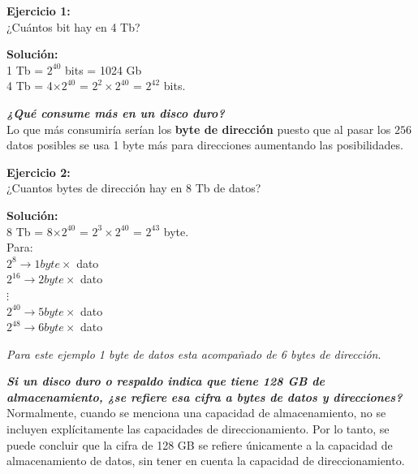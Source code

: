 \documentclass{templateNote}
\begin{document}
\begin{tcolorbox}[colback=green!5!white,colframe=green!75!black,title=Ejercicio]
    \textbf{Ejercicio 1:} \\
    ¿Cuántos bit hay en 4 Tb? \\
    \begin{center}
        \textbf{Solución:} \\
        1 Tb = $2^{40}$ bits = 1024 Gb\\
        4 Tb = 4$\times2^{40}$ = $2^{2}\times2^{40}$ = $2^{42}$ bits.

    \end{center}
\end{tcolorbox}

\noindent \textit{\textbf{¿Qué consume más en un disco duro?}}\\
Lo que más consumiría serían los \textbf{byte de dirección} puesto que al pasar los $256$ datos posibles se usa 1 byte más para direcciones aumentando las posibilidades. 

\begin{tcolorbox}[colback=green!5!white,colframe=green!75!black,title=Ejercicio]
    \textbf{Ejercicio 2:} \\
    ¿Cuantos bytes de dirección hay en 8 Tb de datos? \\
    \begin{center}
        \textbf{Solución:} \\
        8 Tb = 8$\times2^{40}$ = $2^{3}\times2^{40}$ = $2^{43}$ byte.\\
        Para: \\
        $2^{8}\rightarrow 1 $\space$byte \times$ dato \\
        $2^{16}\rightarrow 2 $\space$byte \times$ dato \\
        $\vdots$ \\
        $2^{40}\rightarrow 5 $\space$byte \times$ dato \\
        $2^{48}\rightarrow 6 $\space$byte \times$ dato \\
    \end{center}
    \textit{Para este ejemplo 1 byte de datos esta acompañado de 6 bytes de dirección}.
\end{tcolorbox}

\noindent \textbf{\textit{Si un disco duro o respaldo indica que tiene 128 GB de almacenamiento, ¿se refiere esa cifra a bytes de datos y direcciones?}} \\
Normalmente, cuando se menciona una capacidad de almacenamiento, no se incluyen explícitamente las capacidades de direccionamiento. Por lo tanto, se puede concluir 
que la cifra de 128 GB se refiere únicamente a la capacidad de almacenamiento de datos, sin tener en cuenta la capacidad de direccionamiento.
\newpage
\end{document}
